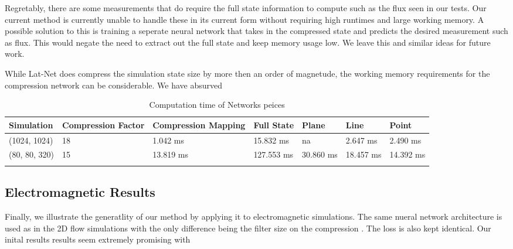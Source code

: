 \documentclass{article}
\begin{document}
Regretably, there are some measurements that do require the full state information to compute such as the flux seen in our tests. Our current method is currently unable to handle these in its current form without requiring high runtimes and large working memory. A possible solution to this is training a seperate neural network that takes in the compressed state and predicts the desired measurement such as flux. This would negate the need to extract out the full state and keep memory usage low. We leave this and similar ideas for future work.

While Lat-Net does compress the simulation state size by more then an order of magnetude, the working memory requirements for the compression network can be considerable. We have absurved


\begin{table}[]
\caption{Computation time of Networks peices} \label{compute_times}
\centering
\begin{tabular}{|l|llllll|}
\hline
Simulation    & Compression Factor & Compression Mapping & Full State  & Plane      & Line       & Point   \\ \hline
(1024, 1024)  & 18                 & 1.042 ms            & 15.832 ms   & na         & 2.647 ms   & 2.490 ms \\ 
(80, 80, 320) & 15                 & 13.819 ms           & 127.553 ms  & 30.860 ms  & 18.457 ms  & 14.392 ms \\ 
\hline
\label{computation_table}
\end{tabular}
\end{table}

\subsection{Electromagnetic Results}

Finally, we illustrate the generatlity of our method by applying it to electromagnetic simulations. The same nueral network architecture is used as in the 2D flow simulations with the only difference being the filter size on the compression . The loss is also kept identical. Our inital results results seem extremely promising with 
\end{document}
